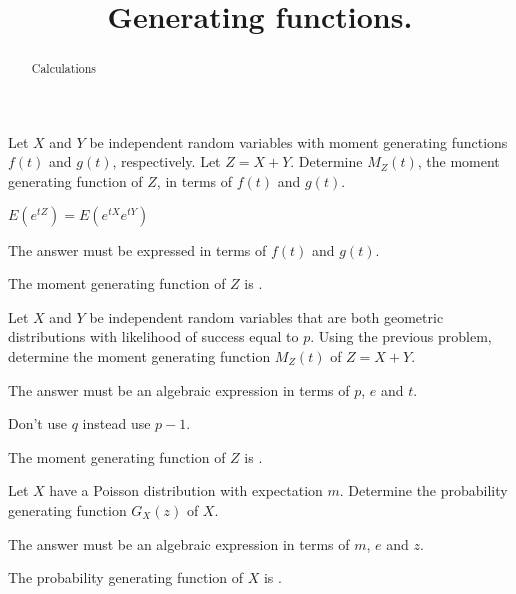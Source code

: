 \documentclass{ximera}
\title{Generating functions.}
\begin{document}
\begin{abstract}
Calculations
\end{abstract}
\maketitle

\begin{question} 
Let $X$ and $Y$ be independent random variables with moment generating functions $f(t)$ and $g(t)$, respectively. Let $Z=X+Y$. Determine $M_{Z}(t)$, the moment generating function of $Z$, in terms of $f(t)$ and $g(t)$.
     \begin{hint}
          $E(e^{tZ}) = E(e^{tX}e^{tY})$
     \end{hint}
     \begin{hint}
          The answer must be expressed in terms of $f(t)$ and $g(t)$.
     \end{hint}
     \begin{solution}
          The moment generating function of $Z$ is .
     \end{solution}
\end{question}

\begin{question}
Let $X$ and $Y$ be independent random variables that are both geometric distributions with likelihood of success equal to $p$. Using the previous problem, determine the moment generating function $M_{Z}(t)$ of $Z=X+Y$.
     \begin{hint}
          The answer must be an algebraic expression in terms of $p$, $e$ and $t$. 
     \end{hint}
     \begin{hint}
          Don't use $q$ instead use $p-1$.
     \end{hint} 
     \begin{solution}
          The moment generating function of $Z$ is .
     \end{solution}
\end{question}

\begin{question}
Let $X$ have a Poisson distribution with expectation $m$. Determine the probability generating function $G_{X}(z)$ of $X$.
     \begin{hint}
          The answer must be an algebraic expression in terms of $m$, $e$ and $z$.
     \end{hint}
     \begin{solution}
          The probability generating function of $X$ is .
     \end{solution}
\end{question}
\end{document}
